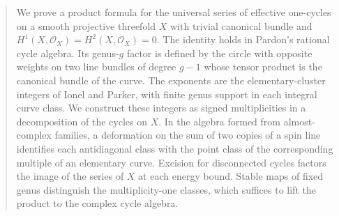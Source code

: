 \begin{abstract}
We prove a product formula for the universal series of effective
one-cycles on a smooth projective threefold $X$ with trivial canonical
bundle and $H^1(X,\mathcal O_X)=H^2(X,\mathcal O_X)=0$.
The identity holds in Pardon's rational cycle algebra. Its genus-$g$
factor is defined by the circle with opposite weights on two line
bundles of degree $g-1$ whose tensor product is the canonical bundle
of the curve. The exponents are the elementary-cluster integers of
Ionel and Parker, with finite genus support in each integral curve class.
We construct these integers as signed multiplicities in a decomposition
of the cycles on $X$. In the algebra formed from almost-complex
families, a deformation on the sum of two copies of a spin line
identifies each antidiagonal class with the point class of the
corresponding multiple of an elementary curve. Excision for
disconnected cycles factors the image of the series of $X$ at each
energy bound. Stable maps of fixed genus distinguish the multiplicity-one
classes, which suffices to lift the product to the complex cycle algebra.
\end{abstract}
